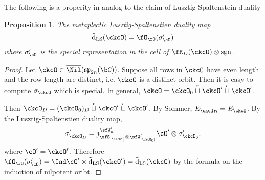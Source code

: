 \documentclass[12pt,a4paper]{amsart}
\def\abs#1{\left|{#1}\right|}
\newcommand{\sgn}{\operatorname{sgn}}
\numberwithin{equation}{section}
\newtheorem{prop}[thm]{Proposition}
\theoremstyle{remark}
\def\tdLS{\tilde{\mathrm{d}}_{\mathrm{LS}}}
\begin{document}
The following is a properity in analog to the claim of Lusztig-Spaltenstein duality
\begin{prop}
  The metaplectic Lusztig-Spaltenstien duality map
  \[
    \tdLS(\ckcO) = \SpringerO(\sigma'_{\cO})
  \]
  where $\sigma'_{\cO}$ is the special representation in the cell of $\RRD(\ckcO)\otimes \sgn$.
\end{prop}
\begin{proof}
  Let $\ckcO\in \bNilSP$.
  Suppose all rows in $\ckcO$ have even length and the row length are distinct,
  i.e. $\ckcO$ is a distinct orbit.
  Then it is easy to compute $\sigma_{\ckcO}$ which is special.
  In general, $\ckcO = \ckcO_{0}\cuprow \ckcO'\cuprow \ckcO'$.

  Then $\ckcO_{D} = (\ckcO_{0})_{D} \cuprow \ckcO'\cuprow \ckcO'$.
  By Sommer, $E_{\ckcO_{D}} = E_{\ckcO}$.
  By the Lusztig-Spaltenstien duality map,
  \[
    \sigma'_{\ckcO_{D}} = j_{\sfS_{\abs{\ckcO'}}\otimes \sfW'_{\abs{\ckcO_{0}}}}^{\sfW'_{n}}
    \cO'\otimes \sigma'_{\ckcO_{0}}.
  \]
  where $\cO' = \ckcO^{t}$.
  Therefore
  $\SpringerO(\sigma'_{\cO})  = \Ind \cO' \times \tdLS(\ckcO') = \tdLS(\ckcO)$
  by the formula on the induction of nilpotent oribt.
\end{proof}
\end{document}
